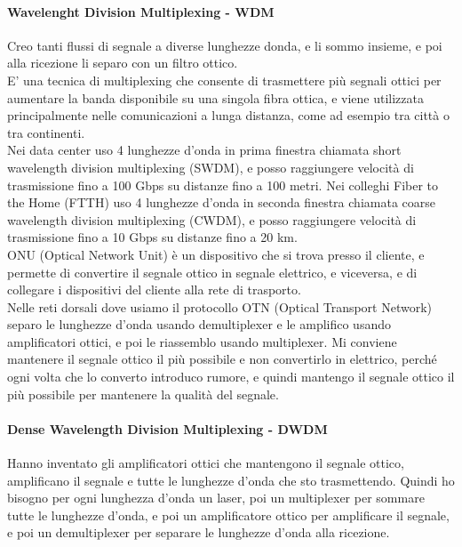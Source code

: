 \paragraph{Wavelenght Division Multiplexing - WDM}
Creo tanti flussi di segnale a diverse lunghezze donda, e li sommo insieme, e poi alla ricezione li separo con un filtro ottico.\\
E' una tecnica di multiplexing che consente di trasmettere più segnali ottici per aumentare la banda disponibile su una singola fibra ottica, e viene utilizzata principalmente nelle comunicazioni a lunga distanza, 
come ad esempio tra città o tra continenti.\\

Nei data center uso 4 lunghezze d'onda in prima finestra chiamata short wavelength division multiplexing (SWDM), e posso raggiungere velocità di trasmissione fino a 100 Gbps su distanze fino a 100 metri.
Nei colleghi Fiber to the Home (FTTH) uso 4 lunghezze d'onda in seconda finestra chiamata coarse wavelength division multiplexing (CWDM), e posso raggiungere velocità di trasmissione fino a 10 Gbps su distanze fino a 20 km.\\
ONU (Optical Network Unit) è un dispositivo che si trova presso il cliente, e permette di convertire il segnale ottico in segnale elettrico, e viceversa, e di collegare i dispositivi del cliente alla rete di trasporto.\\

Nelle reti dorsali dove usiamo il protocollo OTN (Optical Transport Network) separo le lunghezze d'onda usando demultiplexer e le amplifico usando amplificatori ottici, e poi le riassemblo usando multiplexer.
Mi conviene mantenere il segnale ottico il più possibile e non convertirlo in elettrico, perché ogni volta che lo converto introduco rumore, e quindi mantengo il segnale ottico il più possibile per mantenere la qualità del segnale.\\

\paragraph{Dense Wavelength Division Multiplexing - DWDM}
Hanno inventato gli amplificatori ottici che mantengono il segnale ottico, amplificano il segnale e tutte le lunghezze d'onda che sto trasmettendo. 
Quindi ho bisogno per ogni lunghezza d'onda un laser, poi un multiplexer per sommare tutte le lunghezze d'onda, e poi un amplificatore ottico per amplificare il segnale, 
e poi un demultiplexer per separare le lunghezze d'onda alla ricezione.\\

